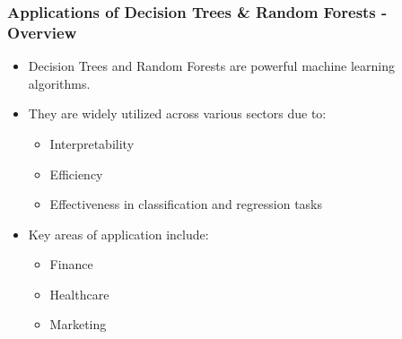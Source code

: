 \documentclass{beamer}
\begin{document}
\begin{frame}
    \frametitle{Applications of Decision Trees \& Random Forests - Overview}
    \begin{itemize}
        \item Decision Trees and Random Forests are powerful machine learning algorithms.
        \item They are widely utilized across various sectors due to:
        \begin{itemize}
            \item Interpretability
            \item Efficiency
            \item Effectiveness in classification and regression tasks
        \end{itemize}
        \item Key areas of application include:
        \begin{itemize}
            \item Finance
            \item Healthcare
            \item Marketing
        \end{itemize}
    \end{itemize}
\end{frame}
\end{document}

